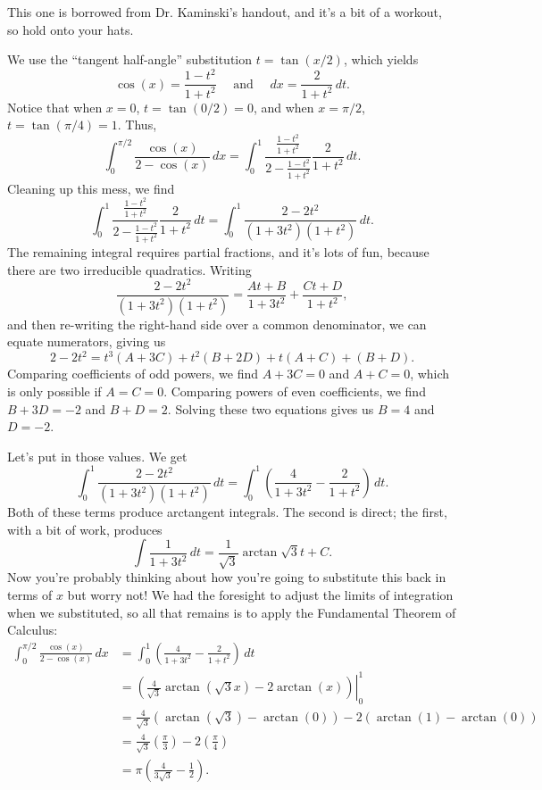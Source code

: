 \documentclass[12pt]{article}
\begin{document}
\begin{enumerate}
 \medskip
 
 This one is borrowed from Dr. Kaminski's handout, and it's a bit of a workout, so hold onto your hats.
 
 We use the ``tangent half-angle'' substitution $t=\tan(x/2)$, which yields
 \[
 \cos(x) = \frac{1-t^2}{1+t^2} \quad \text{ and } \quad dx = \frac{2}{1+t^2}\,dt.
 \]
Notice that when $x=0$, $t=\tan(0/2)=0$, and when $x=\pi/2$, $t=\tan(\pi/4)=1$. Thus,
\[
\int_0^{\pi/2}\frac{\cos(x)}{2-\cos(x)}\,dx = \int_0^1 \frac{\frac{1-t^2}{1+t^2}}{2-\frac{1-t^2}{1+t^2}}\frac{2}{1+t^2}\,dt.
\]
Cleaning up this mess, we find
\[
\int_0^1 \frac{\frac{1-t^2}{1+t^2}}{2-\frac{1-t^2}{1+t^2}}\frac{2}{1+t^2}\,dt = \int_0^1\frac{2-2t^2}{(1+3t^2)(1+t^2)}\,dt.
\]
The remaining integral requires partial fractions, and it's lots of fun, because there are two irreducible quadratics. Writing
\[
\frac{2-2t^2}{(1+3t^2)(1+t^2)} = \frac{At+B}{1+3t^2}+\frac{Ct+D}{1+t^2},
\]
and then re-writing the right-hand side over a common denominator, we can equate numerators, giving us
\[
2-2t^2 = t^3(A+3C)+t^2(B+2D)+t(A+C)+(B+D).
\]
Comparing coefficients of odd powers, we find $A+3C=0$ and $A+C=0$, which is only possible if $A=C=0$. Comparing powers of even coefficients, we find $B+3D=-2$ and $B+D=2$. Solving these two equations gives us $B=4$ and $D=-2$.

Let's put in those values. We get
\[
\int_0^1\frac{2-2t^2}{(1+3t^2)(1+t^2)}\,dt = \int_0^1\left(\frac{4}{1+3t^2}-\frac{2}{1+t^2}\right)\,dt.
\]
Both of these terms produce arctangent integrals. The second is direct; the first, with a bit of work, produces
\[
\int\frac{1}{1+3t^2}\,dt = \frac{1}{\sqrt{3}}\arctan{\sqrt{3}t}+C.
\]
Now you're probably thinking about how you're going to substitute this back in terms of $x$ but worry not! We had the foresight to adjust the limits of integration when we substituted, so all that remains is to apply the Fundamental Theorem of Calculus:
\begin{align*}
\int_0^{\pi/2}\frac{\cos(x)}{2-\cos(x)}\,dx & = \int_0^1\left(\frac{4}{1+3t^2}-\frac{2}{1+t^2}\right)\,dt \tag{by all our work above}\\
& = \left.\left(\frac{4}{\sqrt{3}}\arctan(\sqrt{3}x)-2\arctan(x)\right)\right|_0^1\\
& = \frac{4}{\sqrt{3}}(\arctan(\sqrt{3})-\arctan(0))-2(\arctan(1)-\arctan(0))\\
& = \frac{4}{\sqrt{3}}\left(\frac{\pi}{3}\right)-2\left(\frac{\pi}{4}\right)\\
& = \pi\left(\frac{4}{3\sqrt{3}}-\frac12\right).
\end{align*}
 \end{enumerate}
\end{document}
